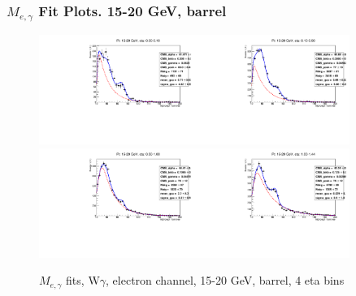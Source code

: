 \begin{frame}\frametitle{$M_{e,\gamma}$ Fit Plots. 15-20 GeV, barrel}
\begin{figure}[htb]
  \begin{center}
   \includegraphics[width=0.45\textwidth]{../figs/figs_v11/ELECTRON_WGamma/EtoGammaFits/sa_hZmass_h_Data_EtoGamma_Enr_BARREL_pt15to20_ieta0.pdf}\includegraphics[width=0.45\textwidth]{../figs/figs_v11/ELECTRON_WGamma/EtoGammaFits/sa_hZmass_h_Data_EtoGamma_Enr_BARREL_pt15to20_ieta1.pdf}\\
   \includegraphics[width=0.45\textwidth]{../figs/figs_v11/ELECTRON_WGamma/EtoGammaFits/sa_hZmass_h_Data_EtoGamma_Enr_BARREL_pt15to20_ieta2.pdf}\includegraphics[width=0.45\textwidth]{../figs/figs_v11/ELECTRON_WGamma/EtoGammaFits/sa_hZmass_h_Data_EtoGamma_Enr_BARREL_pt15to20_ieta3.pdf}\\
  \caption{$M_{e,\gamma}$ fits, W$\gamma$, electron channel, 15-20 GeV, barrel, 4 eta bins}
  \end{center}
\end{figure}
\end{frame}%
